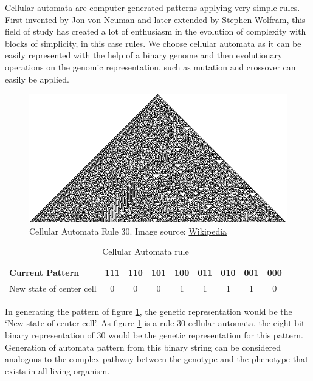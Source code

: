 \documentclass[letterpaper]{article}
\numberwithin{equation}{section}
\begin{document}
Cellular automata are computer generated patterns applying very simple rules. First invented by Jon von Neuman and later extended by Stephen Wolfram, this field of study has created a lot of enthusiasm in the evolution of complexity with blocks of simplicity, in this case rules. We choose cellular automata as it can be easily represented with the help of a binary genome and then evolutionary operations on the genomic representation, such as mutation and crossover can easily be applied.

\begin{figure}[H]
	\centering
	\includegraphics[scale=5]{../tex/images/CA_rule30s}
	\caption[Cellular Automata]{Cellular Automata Rule 30.
	Image source: \href{http://en.wikipedia.org/wiki/Cellular_automata}{Wikipedia}}
	\label{fig:cellular-automata-rule-30}
\end{figure}

\begin{table}[H]
	\centering
	\setlength\tabcolsep{2pt}
	\begin{tabular}{| p{2.2cm} | c | c | c | c | c | c | c | c |}
	  \hline
	  Current Pattern & 111 & 110 & 101 & 100 & 011 & 010 & 001 & 000 \\ \hline
	  New state of center cell & 0 & 0 & 0 & 1 & 1 & 1 & 1 & 0 \\
	  \hline
	\end{tabular}
	\caption{Cellular Automata rule}
	\label{tab:cellular-automata-rule}
\end{table}

In generating the pattern of figure \ref{fig:cellular-automata-rule-30}, the genetic representation would be the `New state of center cell'. As figure \ref{fig:cellular-automata-rule-30} is a rule 30 cellular automata, the eight bit binary representation of 30 would be the genetic representation for this pattern. Generation of automata pattern from this binary string can be considered analogous to the complex pathway between the genotype and the phenotype that exists in all living organism.
\end{document}
